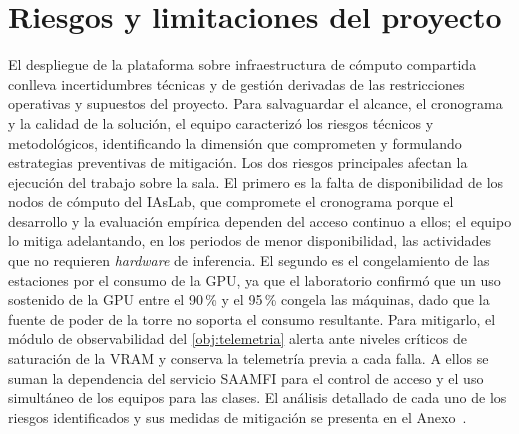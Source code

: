 \section{Riesgos y limitaciones del proyecto}
\label{sec:riesgos-limitaciones}

El despliegue de la plataforma sobre infraestructura de cómputo compartida conlleva incertidumbres técnicas y de gestión derivadas de las restricciones operativas y supuestos del proyecto. Para salvaguardar el alcance, el cronograma y la calidad de la solución, el equipo caracterizó los riesgos técnicos y metodológicos, identificando la dimensión que comprometen y formulando estrategias preventivas de mitigación. Los dos riesgos principales afectan la ejecución del trabajo sobre la sala. El primero es la falta de disponibilidad de los nodos de cómputo del IAsLab, que compromete el cronograma porque el desarrollo y la evaluación empírica dependen del acceso continuo a ellos; el equipo lo mitiga adelantando, en los periodos de menor disponibilidad, las actividades que no requieren \emph{hardware} de inferencia. El segundo es el congelamiento de las estaciones por el consumo de la GPU, ya que el laboratorio confirmó que un uso sostenido de la GPU entre el 90\,\% y el 95\,\% congela las máquinas, dado que la fuente de poder de la torre no soporta el consumo resultante. Para mitigarlo, el módulo de observabilidad del \cref{obj:telemetria} alerta ante niveles críticos de saturación de la VRAM y conserva la telemetría previa a cada falla. A ellos se suman la dependencia del servicio SAAMFI para el control de acceso y el uso simultáneo de los equipos para las clases. El análisis detallado de cada uno de los riesgos identificados y sus medidas de mitigación se presenta en el Anexo~.
